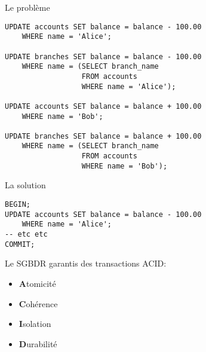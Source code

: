 \documentclass[xetex,dvipsnames]{beamer}
\begin{document}
\begin{frame}[fragile]{Le problème}
	\begin{verbatim}
UPDATE accounts SET balance = balance - 100.00
    WHERE name = 'Alice';
    
UPDATE branches SET balance = balance - 100.00
    WHERE name = (SELECT branch_name 
                  FROM accounts 
                  WHERE name = 'Alice');
                 
UPDATE accounts SET balance = balance + 100.00
    WHERE name = 'Bob';
    
UPDATE branches SET balance = balance + 100.00
    WHERE name = (SELECT branch_name 
                  FROM accounts 
                  WHERE name = 'Bob');
    \end{verbatim}
\end{frame}

\begin{frame}[fragile]{La solution}
	\begin{verbatim}
BEGIN;
UPDATE accounts SET balance = balance - 100.00
    WHERE name = 'Alice';
-- etc etc
COMMIT;
    \end{verbatim}
    Le SGBDR garantis des transactions ACID:
	\begin{itemize}
		\item \textbf{A}tomicité
		\item \textbf{C}ohérence
		\item \textbf{I}solation
		\item \textbf{D}urabilité
	\end{itemize}
    
\end{frame}
\end{document}
